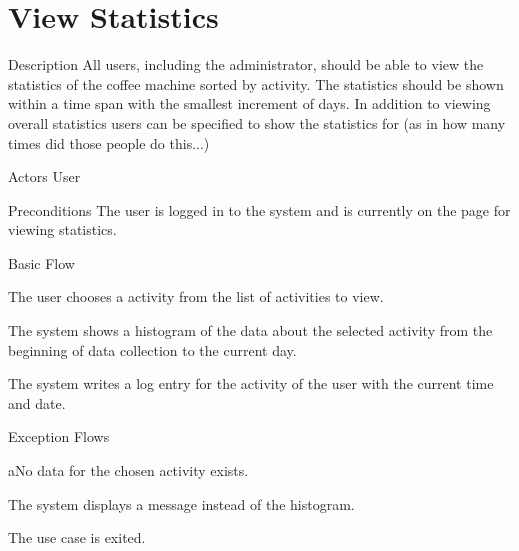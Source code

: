 \section{View Statistics}

%
\begin{cpart}{Description}
All users, including the administrator, should be able to view the statistics of the coffee machine sorted by activity. The statistics should be shown within a time span with the smallest increment of days. In addition to viewing overall statistics users can be specified to show the statistics for (as in how many times did those people do this...)
\end{cpart}


%
\begin{cpart}{Actors}
User
\end{cpart}

%
\begin{cpart}{Preconditions}
The user is logged in to the system and is currently on the page for viewing statistics.
\end{cpart}

%
\begin{cpartList}{Basic Flow}
  \item The user chooses a activity from the list of activities to view.
  \item The system shows a histogram of the data about the selected activity from the beginning of data collection to the current day.
  \item The system writes a log entry for the activity of the user with the current time and date.
\end{cpartList}

%
\begin{cpartList}{Exception Flows}
  \begin{innerList}{2}{a}{No data for the chosen activity exists.}
    \item The system displays a message instead of the histogram.
    \item The use case is exited.
  \end{innerList}
\end{cpartList}

\clearpage
